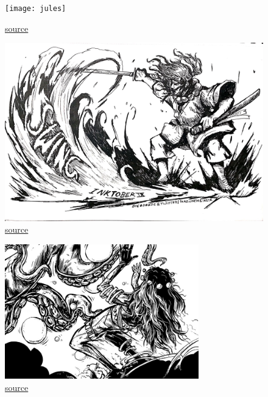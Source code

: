 \documentclass[12pt,a4paper,twoside,openany]{book}
\begin{document}



\begin{figure}[h!]
  \centering
  \caption{\href{https://aukceaukci.s3.amazonaws.com/aukceaukci/production/files/2024/02/06/10/15/12/906b839a-538e-4f31-bbcc-131d423cb646/1.webp}{source}}
  \texttt{[image: jules]}
\end{figure}




\begin{figure}[h!]
  \centering
  \caption{\href{https://pbs.twimg.com/media/EGcmJ2vU0AIqTU9?format=jpg&name=large}{source}}
  \includegraphics[width=\textwidth]{swing}
\end{figure}




\begin{figure}[h!]
  \centering
  \caption{\href{https://www.humanart.cz/user/2527/art/st/2527-1324900216-2.jpg}{source}}
  \includegraphics[width=0.75\textwidth]{chobotnice}
\end{figure}
\end{document}
